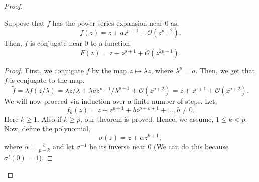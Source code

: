 \begin{proof}
\begin{theorem}
	Suppose that \( f \) has the power series expansion near \( 0 \) as,\[
		f(z)=z+az^{p+1}+\mathcal{O}(z^{p+2})
	.\] Then, \( f \) is conjugate near \( 0 \) to a function \[
	F(z)=z-z^{p+1}+\mathcal{O}(z^{2p+1})
	.\] 
\end{theorem}
\begin{proof}
	First, we conjugate \( f \) by the map \( z\mapsto \lambda z \), where \( \lambda^p=a \). Then, we get that \( f \) is conjugate to the map, \[ \tilde{f}=\lambda f(z /\lambda)=\lambda z /\lambda+\lambda a z^{p+1} /\lambda^{p+1}+\mathcal{O}(z^{p+2})=z+z^{p+1}+\mathcal{O}(z^{p+2}). \]
	We will now proceed via induction over a finite number of steps. Let, \[
		f_k(z)=z+z^{p+1}+bz^{p+k+1}+\ldots, b\neq 0 
	.\] Here \( k\ge 1 \). Also if \( k\ge p \), our theorem is proved. Hence, we assume, \( 1\le k<p \).\\
	Now, define the polynomial, \[
	\sigma(z)=z+\alpha z^{k+1}
	,\] where \( \alpha=\frac{b}{p-k} \) and let \( \sigma^{-1} \) be its inverse near \( 0 \) (We can do this because \( \sigma'(0)=1 \)). 


\end{proof}
\end{proof}
